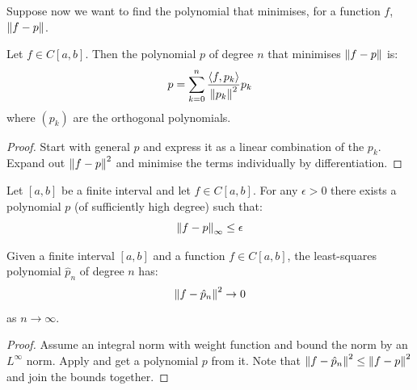 \documentclass[../Main.tex]{subfiles}
\begin{document}
Suppose now we want to find the polynomial that minimises, for a function $f$, $\left\|f - p\right\|$.
\begin{theorem}
    Let $f \in C[a, b]$. Then the polynomial $p$ of degree $n$ that minimises $\left\|f-p\right\|$ is:
    \begin{equation*}
        p = \sum_{k=0}^{n} \frac{\langle f,p_k\rangle}{\left\|p_k\right\|^2} p_k
    \end{equation*}
    where $(p_k)$ are the orthogonal polynomials.
    \label{thmLeastSquares}
\end{theorem}
\begin{proof}
    Start with general $p$ and express it as a linear combination of the $p_k$. Expand out $\left\|f-p\right\|^2$ and minimise the terms individually by differentiation.
\end{proof}
\begin{lemma}
    Let $[a, b]$ be a finite interval and let $f \in C[a, b]$. For any $\epsilon > 0$ there exists a polynomial $p$ (of sufficiently high degree) such that:
    \begin{equation*}
        \left\|f - p\right\|_\infty \leq \epsilon
    \end{equation*}
    \label{lemPolyLimitError}
\end{lemma}
\begin{theorem}
    Given a finite interval $[a, b]$ and a function $f \in C[a, b]$, the least-squares polynomial $\hat{p}_n$ of degree $n$ has:
    \begin{equation*}
        \left\|f - \hat{p}_n\right\|^2 \to 0
    \end{equation*}
    as $n \to \infty$.
    \label{thmPolyLeastSquareError}
\end{theorem}
\begin{proof}
    Assume an integral norm with weight function and bound the norm by an $L^\infty$ norm. Apply  and get a polynomial $p$ from it. Note that $\left\|f - \hat{p}_n\right\|^2 \leq \left\|f - p\right\|^2$ and join the bounds together.
\end{proof}
\end{document}
